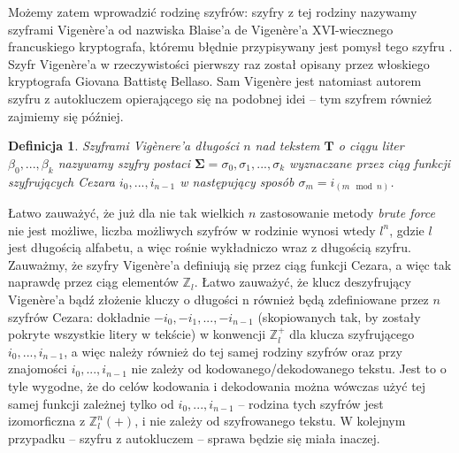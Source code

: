 \documentclass[a4paper]{article}
\theoremstyle{defn}
\newtheorem{defn}{Definicja}[subsection]
\theoremstyle{theorem}
\theoremstyle{lemma}
\theoremstyle{cor}
\theoremstyle{fact}
\begin{document}
Możemy zatem wprowadzić rodzinę szyfrów: szyfry z tej rodziny nazywamy szyframi Vigenère'a od nazwiska Blaise'a de Vigenère'a XVI-wiecznego francuskiego kryptografa, któremu błędnie przypisywany jest pomysł tego szyfru \cite{vigenere}. Szyfr Vigenère'a w rzeczywistości pierwszy raz został opisany przez włoskiego kryptografa Giovana Battistę Bellaso. Sam Vigenère jest natomiast autorem szyfru z autokluczem \cite{autokey} opierającego się na podobnej idei – tym szyfrem również zajmiemy się później.\\
\begin{defn}\label{defn4.2.1}
\textit{Szyframi Vigènere'a} długości $n$ nad tekstem $\boldsymbol{T}$ o ciągu liter $\beta_0, ..., \beta_k$ nazywamy szyfry postaci $\boldsymbol{\Sigma} = \sigma_0, \sigma_1, ..., \sigma_k$ wyznaczane przez ciąg funkcji szyfrujących Cezara $i_0, ..., i_{n-1}$ w następujący sposób $\sigma_m = i_{(m \mod n)}$.
\end{defn}
Łatwo zauważyć, że już dla nie tak wielkich $n$ zastosowanie metody \textit{brute force} nie jest możliwe, liczba możliwych szyfrów w rodzinie wynosi wtedy $l^n$, gdzie $l$ jest długością alfabetu, a więc rośnie wykładniczo wraz z długością szyfru. Zauważmy, że szyfry Vigenère'a definiują się przez ciąg funkcji Cezara, a więc tak naprawdę przez ciąg elementów $\mathbb{Z}_l$. Łatwo zauważyć, że klucz deszyfrujący Vigenère'a bądź złożenie kluczy o długości n również będą zdefiniowane przez $n$ szyfrów Cezara: dokładnie $-i_0, -i_1, ..., -i_{n-1}$ (skopiowanych tak, by zostały pokryte wszystkie litery w tekście) w konwencji $\mathbb{Z}_l^+$ dla klucza szyfrującego $i_0, ..., i_{n-1}$, a więc należy również do tej samej rodziny szyfrów oraz przy znajomości $i_0, ..., i_{n-1}$ nie zależy od kodowanego/dekodowanego tekstu. Jest to o tyle wygodne, że do celów kodowania i dekodowania można wówczas użyć tej samej funkcji zależnej tylko od $i_0, ..., i_{n-1}$ – rodzina tych szyfrów jest izomorficzna z $\mathbb{Z}_l^n(+)$, i nie zależy od szyfrowanego tekstu. W kolejnym przypadku – szyfru z autokluczem – sprawa będzie się miała inaczej.\\
\end{document}
